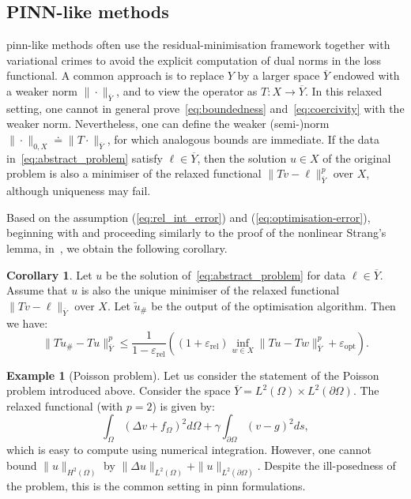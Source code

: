 \documentclass[oneside,reqno,11pt,a4paper]{amsart}
\theoremstyle{definition}
\newtheorem{example}{Example}[section]
\newtheorem{corollary}{Corollary}[section]
\begin{document}
\subsection{PINN-like methods}\label{sub:variational_crimes}

\ac{pinn}-like methods often use the residual-minimisation framework together with
variational crimes to avoid the explicit computation of dual norms in the loss
functional. A common approach is to replace $Y$ by a larger space
$\overline{Y}$ endowed with a weaker norm $\|\cdot\|_{\overline{Y}}$, and to
view the operator as $T: X \rightarrow \overline{Y}$. In this relaxed setting,
one cannot in general prove~\eqref{eq:boundedness} and~\eqref{eq:coercivity}
with the weaker norm. Nevertheless, one can define the weaker (semi-)norm
$\| \cdot \|_{0,X} \doteq \| T \cdot \|_{\overline{Y}}$, for which analogous
bounds are immediate. If the data in~\eqref{eq:abstract_problem} satisfy
$\ell \in \overline{Y}$, then the solution $u \in X$ of the original problem is
also a minimiser of the relaxed functional
$\| T v - \ell \|^p_{\overline{Y}}$ over $X$, although uniqueness may fail.

Based on the assumption (\ref{eq:rel_int_error}) and
(\ref{eq:optimisation-error}), beginning with
  and proceeding similarly to the proof
of the nonlinear Strang's lemma, in~, we
obtain the following corollary.
\begin{corollary}
  Let $u$ be the solution of~\eqref{eq:abstract_problem} for data
  $\ell \in \overline{Y}$. Assume that $u$ is also the unique minimiser of the
  relaxed functional $\| T v - \ell \|_{\overline{Y}}$ over $X$. Let
  $\tilde{u}_{\#}$ be the output of the optimisation algorithm. Then we have:
  \[
    \| T\tilde{u}_{\#} - Tu\|^p_{\overline{Y}} \leq \frac{1}{1 - \varepsilon_{\mathrm{rel}}} \left( \left(1 + \varepsilon_{\mathrm{rel}}\right) \inf_{w \in X} \|T u - T w\|^p_{\overline{Y}} + \varepsilon_{\mathrm{opt}} \right).
  \]
\end{corollary}
\begin{example}[Poisson problem]\label{ex:poisson-relaxed-loss} Let us consider the statement of the Poisson
problem introduced above. Consider the space $\overline{Y} = L^2(\Omega) \times
L^2(\partial \Omega)$. The relaxed functional (with $p = 2$) is given by:
  \[
   \int_{\Omega} (\Delta v + f_\Omega)^2 d\Omega + \gamma \int_{\partial \Omega} (v - g)^2 ds, 
  \]
which is easy to compute using numerical integration. However, one cannot bound $\|u\|_{H^2(\Omega)}$ by $\|\Delta u\|_{L^2(\Omega)} + \| u\|_{L^2(\partial \Omega)}$. Despite the ill-posedness of the problem, this is the common setting in \ac{pinn} formulations.
\end{example}
\end{document}
